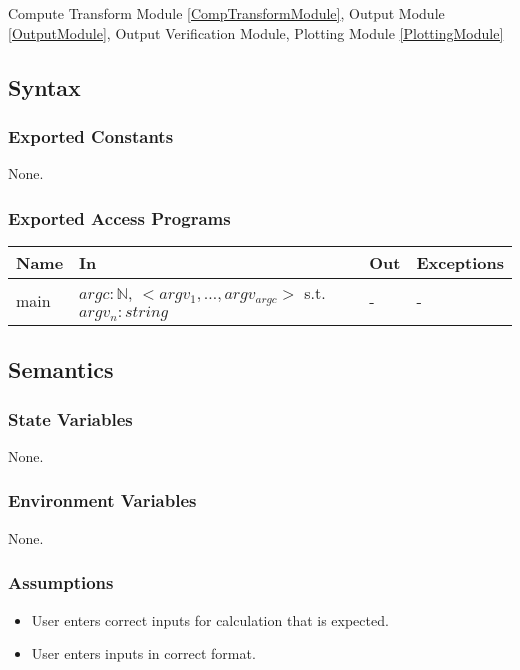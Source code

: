 \documentclass[12pt, titlepage]{article}
\begin{document}
Compute Transform Module \ref{CompTransformModule}, Output Module \ref{OutputModule}, Output Verification Module, Plotting Module \ref{PlottingModule}

\subsection{Syntax}

\subsubsection{Exported Constants}
None.
\subsubsection{Exported Access Programs}

\begin{center}
\begin{tabular}{p{2cm} p{4cm} p{4cm} p{2cm}}
\hline
\textbf{Name} & \textbf{In} & \textbf{Out} & \textbf{Exceptions} \\
\hline
main & $argc: \mathbb{N}$, $<argv_1, \dots, argv_{argc}>$ s.t. $argv_n : string$ & - & - \\
\hline
\end{tabular}
\end{center}

\subsection{Semantics}

\subsubsection{State Variables}
None.

\subsubsection{Environment Variables}
None.

\subsubsection{Assumptions}
\begin{itemize}
\item User enters correct inputs for calculation that is expected.
\item User enters inputs in correct format.
\end{itemize}
\end{document}
